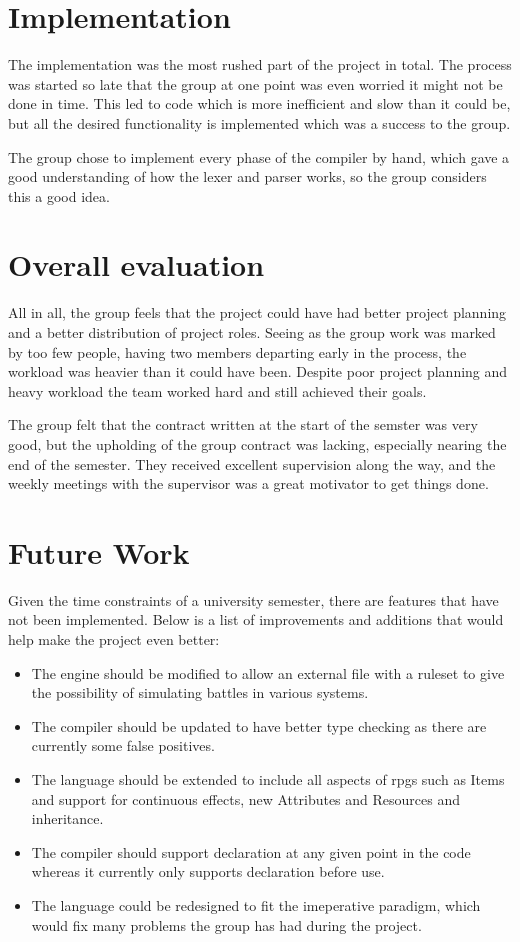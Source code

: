 \section{Implementation}
The implementation was the most rushed part of the project in total. The process was started so late that the group at one point was even worried it might not be done in time. This led to code which is more inefficient and slow than it could be, but all the desired functionality is implemented which was a success to the group.

The group chose to implement every phase of the compiler by hand, which gave a good understanding of how the lexer and parser works, so the group considers this a good idea.

\section{Overall evaluation}

All in all, the group feels that the project could have had better project planning and a better distribution of project roles. Seeing as the group work was marked by too few people, having two members departing early in the process, the workload was heavier than it could have been. Despite poor project planning and heavy workload the team worked hard and still achieved their goals.

The group felt that the contract written at the start of the semster was very good, but the upholding of the group contract was lacking, especially nearing the end of the semester. They received excellent supervision along the way, and the weekly meetings with the supervisor was a great motivator to get things done.

\section{Future Work}
Given the time constraints of a university semester, there are features that have not been implemented. Below is a list of improvements and additions that would help make the project even better:
\begin{itemize}
\item The engine should be modified to allow an external file with a ruleset to give the possibility of simulating battles in various systems. 
\item The compiler should be updated to have better type checking as there are currently some false positives.
\item The language should be extended to include all aspects of \ac{rpg}s such as Items and support for continuous effects, new Attributes and Resources and inheritance.
\item The compiler should support declaration at any given point in the code whereas it currently only supports declaration before use.
\item The language could be redesigned to fit the imeperative paradigm, which would fix many problems the group has had during the project.
\end{itemize}